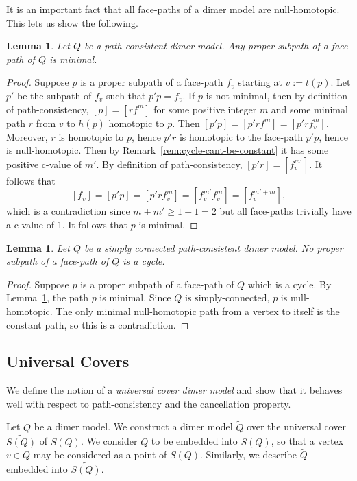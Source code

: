 \documentclass{article}
\newtheorem{lemma}[thm]{Lemma}
\theoremstyle{definition}
\begin{document}
It is an important fact that all face-paths of a dimer model are null-homotopic. This lets us show the following.

\begin{lemma}\label{lem:subpath-of-facepath-is-thin}
    Let $Q$ be a path-consistent dimer model. Any proper subpath of a face-path of $Q$ is minimal.
\end{lemma}
\begin{proof}
	Suppose $p$ is a proper subpath of a face-path $f_v$ starting at $v:=t(p)$. Let $p'$ be the subpath of $f_v$ such that $p'p=f_v$. If $p$ is not minimal, then by definition of path-consistency, $[p]=[rf^m]$ for some positive integer $m$ and some minimal path $r$ from $v$ to $h(p)$ homotopic to $p$. 
	Then $[p'p]=[p'rf^m]=[p'rf_v^m]$. Moreover, $r$ is homotopic to $p$, hence $p'r$ is homotopic to the face-path $p'p$, hence is null-homotopic. Then by Remark~\ref{rem:cycle-cant-be-constant} it has some positive c-value of $m'$. By definition of path-consistency, $[p'r]=[f_v^{m'}]$. It follows that 
	\[[f_v]=[p'p]=[p'rf_v^m]=[f_v^{m'}f_v^m]=[f_v^{m'+m}],\] which is a contradiction since $m+m'\geq1+1=2$ but all face-paths trivially have a c-value of 1. It follows that $p$ is minimal.
\end{proof}

\begin{lemma}\label{lem:subpath-of-facepath-not-cycle}
	Let $Q$ be a simply connected path-consistent dimer model. No proper subpath of a face-path of $Q$ is a cycle.
\end{lemma}
\begin{proof}
	Suppose $p$ is a proper subpath of a face-path of $Q$ which is a cycle. By Lemma~\ref{lem:subpath-of-facepath-is-thin}, the path $p$ is minimal. Since $Q$ is simply-connected, $p$ is null-homotopic. The only minimal null-homotopic path from a vertex to itself is the constant path, so this is a contradiction.
\end{proof}





\subsection{Universal Covers}

We define the notion of a \textit{universal cover dimer model} and show that it behaves well with respect to path-consistency and the cancellation property.

Let $Q$ be a dimer model. We construct a dimer model $\widetilde Q$ over the universal cover $\widetilde{S(Q)}$ of $S(Q)$. We consider $Q$ to be embedded into $S(Q)$, so that a vertex $v\in Q$ may be considered as a point of $S(Q)$. Similarly, we describe $\widetilde Q$ embedded into $\widetilde{S(Q)}$.
\end{document}
